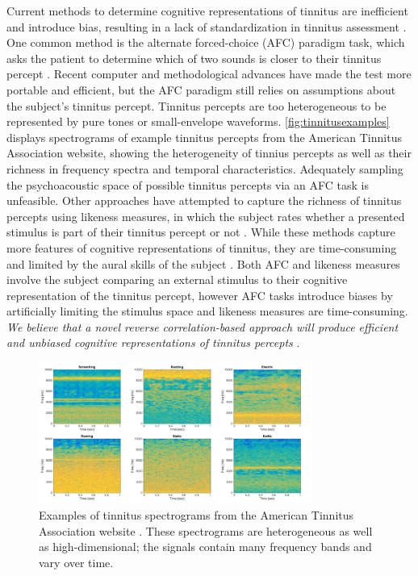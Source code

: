 \documentclass[11pt, notitlepage]{article} %
\begin{document}
Current methods to determine cognitive representations of tinnitus
are inefficient and introduce bias, resulting in a lack of standardization in tinnitus assessment \cite{henryTinnitusEpidemiologicPerspective2020}.
One common method is the alternate forced-choice (AFC) paradigm task, which asks the patient to determine which of two sounds
is closer to their tinnitus percept
\cite{henryComparisonTwoComputerautomated2001,henryComputerautomatedTinnitusAssessment2004,henryComputerautomatedTinnitusAssessment2013,korthOneStepCloser2020}.
Recent computer and methodological advances have made the test more portable and efficient,
but the AFC paradigm still relies on assumptions about the subject's tinnitus percept.
Tinnitus percepts are too heterogeneous to be represented by pure tones or small-envelope waveforms.
\autoref{fig:tinnitusexamples} displays spectrograms of example tinnitus percepts
from the American Tinnitus Association website,
showing the heterogeneity of tinnius percepts as well as their richness in frequency spectra and temporal characteristics.
Adequately sampling the psychoacoustic space of possible tinnitus percepts via an AFC task is unfeasible.
Other approaches have attempted to capture the richness of tinnitus percepts using likeness measures,
in which the subject rates whether a presented stimulus is part of their tinnitus percept or not \cite{norenaPsychoacousticCharacterizationTinnitus2002}.
While these methods capture more features of cognitive representations of tinnitus,
they are time-consuming and limited by the aural skills of the subject \cite{vajsakovicPrinciplesMethodsPsychoacoustic2021}.
Both AFC and likeness measures involve the subject comparing an external stimulus to their cognitive representation of the tinnitus percept,
however AFC tasks introduce biases by artificially limiting the stimulus space and likeness measures are time-consuming.
\emph{We believe that a novel reverse correlation-based approach will produce efficient and unbiased cognitive representations of tinnitus percepts}
\cite{gosselinSuperstitiousPerceptionsReveal2003}.

\begin{figure}[h] %
	\centering
	\includegraphics[width=0.8\textwidth]{Figures/Figures_tinnitus_6.png}
	\caption{Examples of tinnitus spectrograms from the American Tinnitus Association website \cite{Symptoms2015}.
	These spectrograms are heterogeneous as well as high-dimensional; the signals contain many frequency bands and vary over time.}
	\label{fig:tinnitusexamples}
\end{figure}
\end{document}
